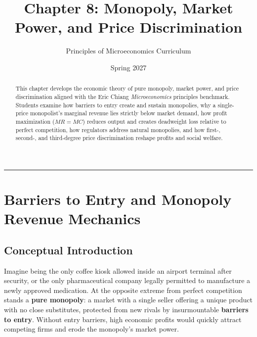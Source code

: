 \documentclass[11pt,letterpaper]{article}
\begin{document}
\title{\Huge\bfseries\color{SlateBlue} Chapter 8: Monopoly, Market Power, and Price Discrimination}
\author{\large Principles of Microeconomics Curriculum}
\date{Spring 2027}
\maketitle

\thispagestyle{plain}

\begin{abstract}
This chapter develops the economic theory of pure monopoly, market power, and price discrimination aligned with the Eric Chiang \emph{Microeconomics} principles benchmark. Students examine how barriers to entry create and sustain monopolies, why a single-price monopolist's marginal revenue lies strictly below market demand, how profit maximization ($MR = MC$) reduces output and creates deadweight loss relative to perfect competition, how regulators address natural monopolies, and how first-, second-, and third-degree price discrimination reshape profits and social welfare.
\end{abstract}

\tableofcontents
\vspace{1.5em}
\hrule
\vspace{1.5em}

\section{Barriers to Entry and Monopoly Revenue Mechanics}

\subsection*{Conceptual Introduction}
Imagine being the only coffee kiosk allowed inside an airport terminal after security, or the only pharmaceutical company legally permitted to manufacture a newly approved medication. At the opposite extreme from perfect competition stands a \textbf{pure monopoly}: a market with a single seller offering a unique product with no close substitutes, protected from new rivals by insurmountable \textbf{barriers to entry}. Without entry barriers, high economic profits would quickly attract competing firms and erode the monopoly's market power.
\end{document}
